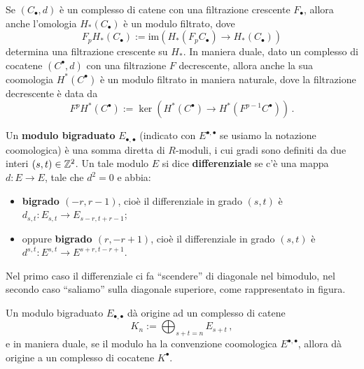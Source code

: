 \begin{oss}
	Se $(C_{\bullet}, d)$ è un complesso di catene con una filtrazione 
	crescente $F_{\bullet}$,
	allora anche l'omologia $H_{*}(C_{\bullet})$ è un modulo filtrato,
	dove
	\begin{equation*}
		F_{p}H_{*}(C_{\bullet}) := 
		\mathrm{im}\left( H_{*}(F_{p}C_{\bullet}) \to H_{*}(C_{\bullet}) \right)
	\end{equation*}
	determina una filtrazione crescente su $H_{*}$.
	In maniera duale, dato un complesso di cocatene 
	 $(C^{\bullet}, d)$ con una filtrazione $F$ decrescente,
	allora anche la sua coomologia $H^{*}(C^{\bullet})$ 
	è un modulo filtrato in maniera naturale,
	dove la filtrazione decrescente è data da
	\begin{equation*}
		F^{p}H^{*}(C^{\bullet}) := 
		\ker \left( H^{*}(C^{\bullet}) \to H^{*}(F^{p-1}C^{\bullet}) \right)\,.
	\end{equation*}
\end{oss}

\begin{df}
	Un \textbf{modulo bigraduato} $E_{\bullet,\bullet}$ 
	(indicato con $E^{\bullet,\bullet}$ se usiamo la notazione coomologica)
	è una somma diretta di $R$-moduli,
	i cui gradi sono definiti da due interi $(s,t) \in {\mathbb Z}^{2}$.
	Un tale modulo $E$ si dice \textbf{differenziale} 
	se c'è una mappa $d:E \to E$, tale che $d^{2}=0$ e abbia:
		\begin{itemize}
		\item \textbf{bigrado $(-r,r-1)$}, cioè il differenziale
		in grado $(s,t)$ è $d_{s,t}:E_{s,t} \to E_{s-r,t+r-1}$;
		
		\item oppure \textbf{bigrado $(r,-r+1)$},
		cioè il differenziale
		in grado $(s,t)$ è $d^{s,t}:E^{s,t} \to E^{s+r,t-r+1}$.
		\end{itemize}
	Nel primo caso il differenziale ci fa ``scendere'' di diagonale nel bimodulo,
	nel secondo caso ``saliamo'' sulla diagonale superiore,
	come rappresentato in figura.
\end{df}


\begin{oss}
	Un modulo bigraduato $E_{\bullet,\bullet}$ dà origine ad un complesso di catene
	\begin{equation*}
		K_{n} := \bigoplus_{s+t=n} E_{s+t}\,,
	\end{equation*}
	e in maniera duale, se il modulo ha la convenzione coomologica $E^{\bullet, \bullet}$,
	allora dà origine a un complesso di cocatene $K^{\bullet}$.
\end{oss}

